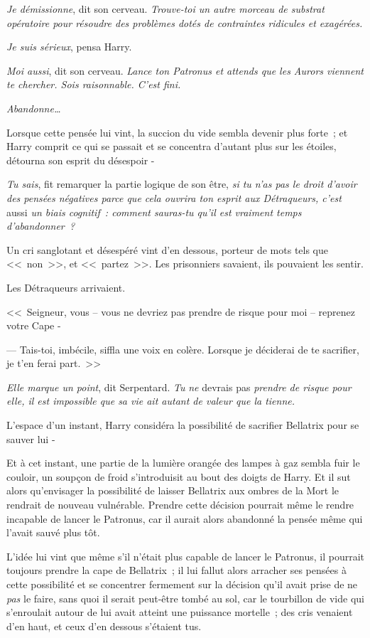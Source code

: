 \emph{Je démissionne}, dit son cerveau. \emph{Trouve-toi un autre morceau de substrat opératoire pour résoudre des problèmes dotés de contraintes ridicules et exagérées.}

\emph{Je suis sérieux}, pensa Harry.

\emph{Moi aussi}, dit son cerveau. \emph{Lance ton Patronus et attends que les Aurors viennent te chercher. Sois raisonnable. C'est fini.}

\emph{Abandonne…}

Lorsque cette pensée lui vint, la succion du vide sembla devenir plus forte~; et Harry comprit ce qui se passait et se concentra d'autant plus sur les étoiles, détourna son esprit du désespoir -

\emph{Tu sais}, fit remarquer la partie logique de son être, \emph{si tu n'as pas le droit d'avoir des pensées négatives parce que cela ouvrira ton esprit aux Détraqueurs, c'est} aussi \emph{un biais cognitif~: comment sauras-tu qu'il est vraiment temps d'abandonner~?}

Un cri sanglotant et désespéré vint d'en dessous, porteur de mots tels que <<~non~>>, et <<~partez~>>. Les prisonniers savaient, ils pouvaient les sentir.

Les Détraqueurs arrivaient.

<<~Seigneur, vous -- vous ne devriez pas prendre de risque pour moi -- reprenez votre Cape -

--- Tais-toi, imbécile, siffla une voix en colère. Lorsque je déciderai de te sacrifier, je t'en ferai part.~>>

\emph{Elle marque un point}, dit Serpentard. \emph{Tu} \emph{ne} devrais pas \emph{prendre de risque pour elle, il est impossible que sa vie ait autant de valeur que la tienne.}

L'espace d'un instant, Harry considéra la possibilité de sacrifier Bellatrix pour se sauver lui -

Et à cet instant, une partie de la lumière orangée des lampes à gaz sembla fuir le couloir, un soupçon de froid s'introduisit au bout des doigts de Harry. Et il sut alors qu'envisager la possibilité de laisser Bellatrix aux ombres de la Mort le rendrait de nouveau vulnérable. Prendre cette décision pourrait même le rendre incapable de lancer le Patronus, car il aurait alors abandonné la pensée même qui l'avait sauvé plus tôt.

L'idée lui vint que même s'il n'était plus capable de lancer le Patronus, il pourrait toujours prendre la cape de Bellatrix~; il lui fallut alors arracher ses pensées à cette possibilité et se concentrer fermement sur la décision qu'il avait prise de ne \emph{pas} le faire, sans quoi il serait peut-être tombé au sol, car le tourbillon de vide qui s'enroulait autour de lui avait atteint une puissance mortelle~; des cris venaient d'en haut, et ceux d'en dessous s'étaient tus.

